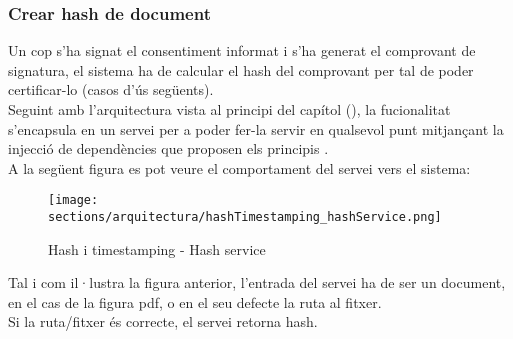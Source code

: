 \subsubsection{Crear hash de document}
Un cop s'ha signat el consentiment informat i s'ha generat el comprovant de signatura, el sistema ha de calcular el hash del comprovant per tal de poder certificar-lo (casos d'ús següents).\\
\newline Seguint amb l'arquitectura vista al principi del capítol (), la fucionalitat s'encapsula en un servei per a poder fer-la servir en qualsevol punt mitjançant la injecció de dependències que proposen els principis .\\
\newline A la següent figura es pot veure el comportament del servei vers el sistema:
\begin{figure}[h]
\texttt{[image: sections/arquitectura/hashTimestamping\_hashService.png]}
\centering
\caption{Hash i timestamping - Hash service}
\label{fig:hash_timestamping_hashService}
\end{figure}
\newline Tal i com il·lustra la figura anterior, l'entrada del servei ha de ser un document, en el cas de la figura pdf, o en el seu defecte la ruta al fitxer.\\
Si la ruta/fitxer és correcte, el servei retorna hash.
\clearpage
